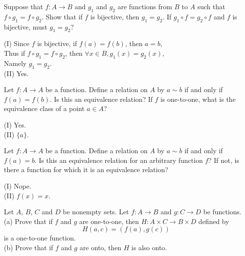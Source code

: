 \documentclass[11pt, a4paper, UTF8]{ctexart}
\begin{document}
\begin{problem}[UD: 15.11]
  Suppose that $f:A \rightarrow B$ and $g_{1}$ and $g_{2}$ are functions from $B$ to 
  $A$ such that $f \circ g_{1} = f \circ g_{2}$. Show that if $f$ is bijective, then 
  $g_{1} = g_{2}$. If $g_{1} \circ f = g_{2} \circ f$ and $f$ is bijective, must $g_{1} = g_{2}$?
\end{problem}

\begin{solution}
  (I) Since $f$ is bijective, if $f(a) = f(b)$, then $a = b$,\\
  Thus if $f \circ g_{1} = f \circ g_{2}$, then $\forall x \in B, g_{1}(x) = g_{2}(x)$,\\
  Namely $g_{1} = g_{2}$.\\
  (II) Yes.
\end{solution}

\begin{problem}[UD: 15.12]
  Let $f:A \rightarrow A$ be a function. Define a relation on $A$ by $a \sim b$ if and 
  only if $f(a) = f(b)$. Is this an equivalence relation? If $f$ is one-to-one, what 
  is the equivalence class of a point $a \in A$?
\end{problem}

\begin{solution}
  (I) Yes.\\
  (II) $\{a\}.$
\end{solution}

\begin{problem}[UD: 15.13]
  Let $f:A \rightarrow A$ be a function. Define a relation on $A$ by $a \sim b$ if 
  and only if $f(a) = b$. Is this an equivalence relation for an arbitrary function 
  $f$? If not, is there a function for which it is an equivalence relation?
\end{problem}

\begin{solution}
  (I) Nope.\\
  (II) $f(x) = x$.
\end{solution}

\begin{problem}[UD: 15.14]
  Let $A$, $B$, $C$ and $D$ be nonempty sets. Let $f:A \rightarrow B$ and $g:C \rightarrow D$ 
  be functions.\\
  (a) Prove that if $f$ and $g$ are one-to-one, then $H:A \times C \rightarrow B \times D$ 
  defined by
  $$H(a,c) = (f(a),g(c))$$
  is a one-to-one function.\\
  (b) Prove that if $f$ and $g$ are onto, then $H$ is also onto.
\end{problem}
\end{document}
